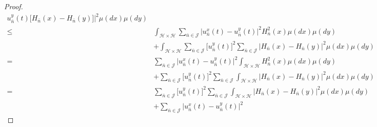 \documentclass[review,onefignum,onetabnum]{siamart190516}
\begin{document}
\begin{proof}
\begin{equation}
\begin{aligned}
                            u_{\bar n}^y(t)
                            \big[
                                H_{\bar n}(x) - H_{\bar n}(y)
                            \big]
                    \Big|^2
                    \mu(dx) \mu(dy)
                    \\
                    \le&
                    \int_{\mathcal{H} \times \mathcal{H}}
                    \sum_{\bar n\in \mathcal{J}}
                    \big|
                        u_{\bar n}^x(t) - u_{\bar n}^y(t)
                    \big |^2
                    H_{\bar n}^2(x)
                    \mu(dx) \mu(dy)
                    \\
                    &+
                    \int_{\mathcal{H}\times \mathcal{H}}
                    \sum_{\bar n\in \mathcal{J}}
                    \big[u_{\bar n} ^ y(t) \big]^2
                    \sum_{\bar n\in \mathcal{J}}
                    \big|
                        H_{\bar n}(x) - H_{\bar n}(y)
                    \big|^2
                    \mu(dx) \mu(dy)
                    \\
                    =&
                    \sum_{\bar n\in \mathcal{J}}
                    \big|
                        u_{\bar n}^x(t)-u_{\bar n}^y(t)
                    \big |^2
                    \int_{\mathcal{H} \times \mathcal{H}}
                    H_{\bar n}^2 (x)
                    \mu(dx) \mu(dy)
                    \\
                    &+
                    \sum_{\bar n\in \mathcal{J}}
                    \big[
                        u_{\bar n}^y(t)
                    \big] ^ 2
                    \sum_{\bar n\in \mathcal{J}}
                    \int_{\mathcal{H}\times \mathcal{H}}
                    \big|
                        H_{\bar n}(x) - H_{\bar n}(y)
                    \big| ^ 2 \mu(dx)\mu(dy)
                    \\
                    =&
                    \sum_{\bar n\in \mathcal{J}}
                    \big[
                        u_{\bar n}^y(t)
                    \big] ^ 2
                    \sum_{\bar n\in \mathcal{J}}
                    \int_{\mathcal{H}\times \mathcal{H}}
                    \big|
                        H_{\bar n}(x) -H_{\bar n}(y)
                    \big|^2 \mu(dx) \mu(dy)
                    \\
                    &+
                    \sum_{\bar n\in \mathcal{J}}
                                \big|
                                    u_{\bar n}^x(t)-u_{\bar n}^y(t)
                                \big| ^ 2

\end{aligned}
\end{equation}
\end{proof}
\end{document}
